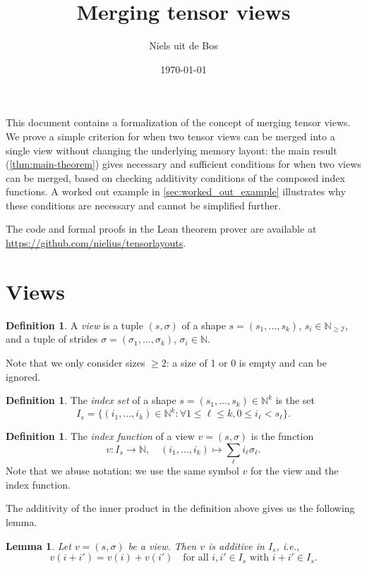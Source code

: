 \documentclass{article}
\title{Merging tensor views}
\author{Niels uit de Bos}
\date{\today}
\newtheorem{lemma}[theorem]{Lemma}
\theoremstyle{definition} %
\newtheorem{definition}[theorem]{Definition}
\newcommand{\bN}{\mathbb{N}}
\newcommand{\defn}[1]{\textit{#1}}
\begin{document}
\maketitle

This document contains a formalization of the concept of merging tensor views.
We prove a simple criterion for when two tensor views can be merged into a single view without changing the underlying memory layout:
the main result (\cref{thm:main-theorem}) gives necessary and sufficient conditions for when two views can be merged, based on checking additivity conditions of the composed index functions.
A worked out example in \cref{sec:worked_out_example} illustrates why these conditions are necessary and cannot be simplified further.

The code and formal proofs in the Lean theorem prover are available at \url{https://github.com/nielius/tensorlayouts}.

\section{Views}
\label{sec:views}

\begin{definition}
    A \defn{view} is a tuple $(s, \sigma)$ of a shape $s = (s_1, \ldots, s_k)$, $s_i \in \mathbb{N_{\geq 2}}$, 
    and a tuple of strides $\sigma = (\sigma_1, \ldots, \sigma_k)$, $\sigma_i \in \mathbb{N}$.
\end{definition}

Note that we only consider sizes $\geq 2$: a size of 1 or 0 is empty and can be ignored.

\begin{definition}
  The \defn{index set} of a shape $s = (s_1, \ldots, s_k) \in \bN^k$ is the set
  \[
    I_s = \{(i_1, \ldots, i_k) \in \bN^k: \forall 1 \leq \ell \leq k, 0 \leq i_\ell < s_\ell \}.
  \]
\end{definition}

\begin{definition}
  \label{def:index-function}
  The \defn{index function} of a view $v = (s, \sigma)$ is the function
  \[
    v \colon I_s \to \bN, \quad (i_1, \ldots, i_k) \mapsto \sum_\ell i_\ell \sigma_\ell.
  \]
  Note that we abuse notation: we use the same symbol $v$ for the view and the index function.
\end{definition}

The additivity of the inner product in the definition above gives us the following lemma.
\begin{lemma}
  \label{lem:index-function-additive}
  Let $v = (s, \sigma)$ be a view.
  Then $v$ is additive in $I_s$, i.e.,
  \[
    v(i + i') = v(i) + v(i') \quad \text{for all $i, i' \in I_s$ with $i + i' \in I_s$}.
  \]
\end{lemma}
\end{document}
